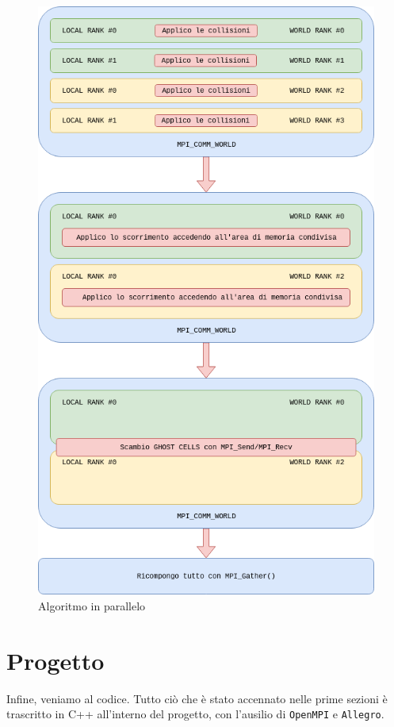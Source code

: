 \documentclass[12pt]{article}
\begin{document}
\begin{figure}
    \centering
    \includegraphics[scale=0.55]{4}
    \caption{Algoritmo in parallelo}
    \label{fig:parallel_algorithm}
\end{figure}




\newpage
\section{Progetto}
Infine, veniamo al codice. Tutto ciò che è stato accennato nelle prime sezioni è trascritto in C++ all'interno del progetto, con l'ausilio di \verb|OpenMPI| e \verb|Allegro|.
\end{document}
